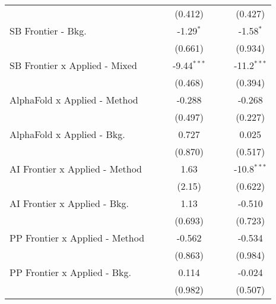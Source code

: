 \begin{tabular}{lcccccc}
                                  &             &              & (0.412)       &              &         & (0.427)\\   
   SB Frontier - Bkg.             &             &              & -1.29$^{*}$   &              &         & -1.58$^{*}$\\   
                                  &             &              & (0.661)       &              &         & (0.934)\\   
   SB Frontier x Applied - Mixed  &             &              & -9.44$^{***}$ &              &         & -11.2$^{***}$\\   
                                  &             &              & (0.468)       &              &         & (0.394)\\   
   AlphaFold x Applied - Method   &             &              & -0.288        &              &         & -0.268\\   
                                  &             &              & (0.497)       &              &         & (0.227)\\   
   AlphaFold x Applied - Bkg.     &             &              & 0.727         &              &         & 0.025\\   
                                  &             &              & (0.870)       &              &         & (0.517)\\   
   AI Frontier x Applied - Method &             &              & 1.63          &              &         & -10.8$^{***}$\\   
                                  &             &              & (2.15)        &              &         & (0.622)\\   
   AI Frontier x Applied - Bkg.   &             &              & 1.13          &              &         & -0.510\\   
                                  &             &              & (0.693)       &              &         & (0.723)\\   
   PP Frontier x Applied - Method &             &              & -0.562        &              &         & -0.534\\   
                                  &             &              & (0.863)       &              &         & (0.984)\\   
   PP Frontier x Applied - Bkg.   &             &              & 0.114         &              &         & -0.024\\   
                                  &             &              & (0.982)       &              &         & (0.507)\\   

\end{tabular}
